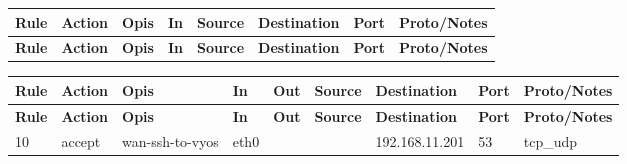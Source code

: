 
\begin{longtable}{|l|l|l|l|l|l|p{2.2cm}|l|}
\hline
\textbf{Rule} & \textbf{Action} & \textbf{Opis} & \textbf{In} & \textbf{Source} & \textbf{Destination} & \textbf{Port} & \textbf{Proto/Notes} \\
\hline
\endfirsthead
\hline
\textbf{Rule} & \textbf{Action} & \textbf{Opis} & \textbf{In} & \textbf{Source} & \textbf{Destination} & \textbf{Port} & \textbf{Proto/Notes} \\
\hline
\endhead
\hline
\end{longtable}


\begin{longtable}{|l|l|l|l|l|l|l|p{2.2cm}|l|}
\hline
\textbf{Rule} & \textbf{Action} & \textbf{Opis} & \textbf{In} & \textbf{Out} & \textbf{Source} & \textbf{Destination} & \textbf{Port} & \textbf{Proto/Notes} \\
\hline
\endfirsthead
\hline
\textbf{Rule} & \textbf{Action} & \textbf{Opis} & \textbf{In} & \textbf{Out} & \textbf{Source} & \textbf{Destination} & \textbf{Port} & \textbf{Proto/Notes} \\
\hline
\endhead
10 & accept & wan-ssh-to-vyos & eth0 &  &  & 192.168.11.201 & 53 & tcp_udp \\
\hline
\end{longtable}


